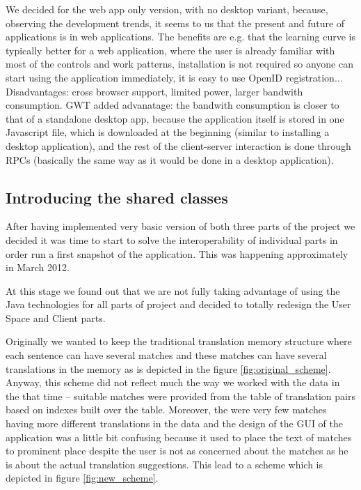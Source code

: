 We decided for the web app only version, with no desktop variant, because, observing the development trends, it seems to us that the present and future of applications is in web applications. The benefits are e.g. that the learning curve is typically better for a web application, where the user is already familiar with most of the controls and work patterns, installation is not required so anyone can start using the application immediately, it is easy to use OpenID registration... Disadvantages: cross browser support, limited power, larger bandwith consumption. GWT added advanatage: the bandwith consumption is closer to that of a standalone desktop app, because the application itself is stored in one Javascript file, which is downloaded at the beginning (similar to installing a desktop application), and the rest of the client-server interaction is done through RPCs (basically the same way as it would be done in a desktop application).

\subsection{Introducing the shared classes}

After having implemented very basic version of both three parts of the project we decided it was time to start to solve the interoperability of individual parts in order run a first snapshot of the application. This was happening approximately in March 2012.

At this stage we found out that we are not fully taking advantage of using the Java technologies for all parts of project and decided to totally redesign the User Space and Client parts.

Originally we wanted to keep the traditional translation memory structure where each sentence can have several matches and these matches can have several translations in the memory as is depicted in the figure \ref{fig:original_scheme}. Anyway, this scheme did not reflect much the way we worked with the data in the that time -- suitable matches were provided from the table of translation pairs based on indexes built over the table. Moreover, the were very few matches having more different translations in the data and the design of the GUI of the application was a little bit confusing because it used to place the text of matches to prominent place despite the user is not as concerned about the matches as he is about the actual translation suggestions. This lead to a scheme which is depicted in figure \ref{fig:new_scheme}.

